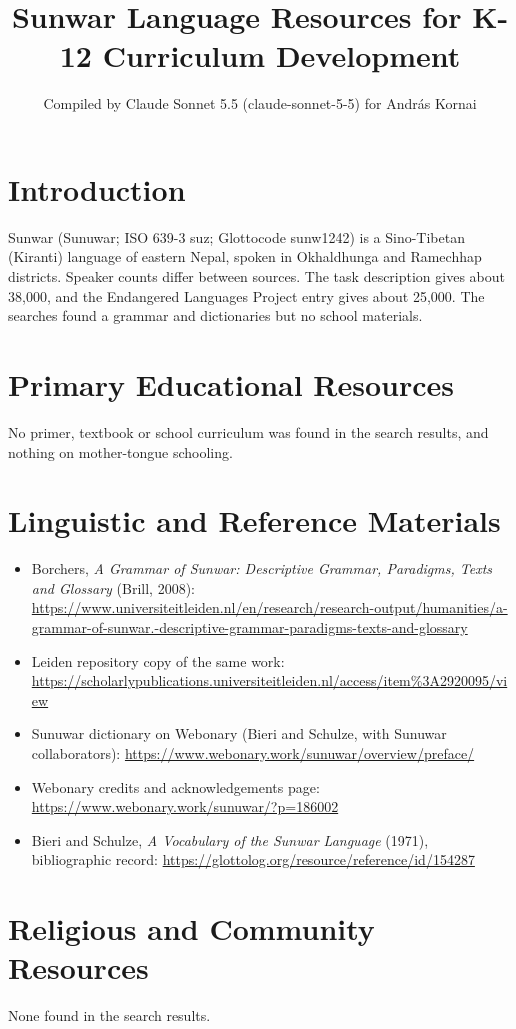 \documentclass[12pt]{article}
\title{Sunwar Language Resources for K-12 Curriculum Development}
\author{Compiled by Claude Sonnet 5.5 (claude-sonnet-5-5) for Andr\'as Kornai}
\date{}
\begin{document}
\maketitle

\section{Introduction}
Sunwar (Sunuwar; ISO 639-3 suz; Glottocode sunw1242) is a Sino-Tibetan (Kiranti) language of eastern Nepal, spoken in Okhaldhunga and Ramechhap districts. Speaker counts differ between sources. The task description gives about 38,000, and the Endangered Languages Project entry gives about 25,000. The searches found a grammar and dictionaries but no school materials.

\section{Primary Educational Resources}
No primer, textbook or school curriculum was found in the search results, and nothing on mother-tongue schooling.

\section{Linguistic and Reference Materials}
\begin{itemize}
\item Borchers, \emph{A Grammar of Sunwar: Descriptive Grammar, Paradigms, Texts and Glossary} (Brill, 2008): \url{https://www.universiteitleiden.nl/en/research/research-output/humanities/a-grammar-of-sunwar.-descriptive-grammar-paradigms-texts-and-glossary}
\item Leiden repository copy of the same work: \url{https://scholarlypublications.universiteitleiden.nl/access/item%3A2920095/view}
\item Sunuwar dictionary on Webonary (Bieri and Schulze, with Sunuwar collaborators): \url{https://www.webonary.work/sunuwar/overview/preface/}
\item Webonary credits and acknowledgements page: \url{https://www.webonary.work/sunuwar/?p=186002}
\item Bieri and Schulze, \emph{A Vocabulary of the Sunwar Language} (1971), bibliographic record: \url{https://glottolog.org/resource/reference/id/154287}
\end{itemize}

\section{Religious and Community Resources}
None found in the search results.
\end{document}
